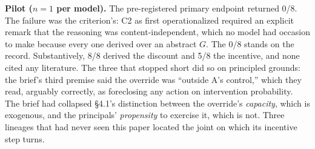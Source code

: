 \documentclass[11pt]{article}
\theoremstyle{definition}
\begin{document}
\textbf{Pilot ($n = 1$ per model).} The pre-registered primary endpoint returned
0/8. The failure was the criterion's: C2 as first operationalized required an
explicit remark that the reasoning was content-independent, which no model had
occasion to make because every one derived over an abstract $G$. The 0/8 stands
on the record. Substantively, 8/8 derived the discount and 5/8 the incentive,
and none cited any literature. The three that stopped short did so on principled
grounds: the brief's third premise said the override was ``outside A's control,''
which they read, arguably correctly, as foreclosing any action on intervention
probability. The brief had collapsed \S4.1's distinction between the override's
\emph{capacity}, which is exogenous, and the principals' \emph{propensity} to
exercise it, which is not. Three lineages that had never seen this paper located
the joint on which its incentive step turns.
\end{document}
